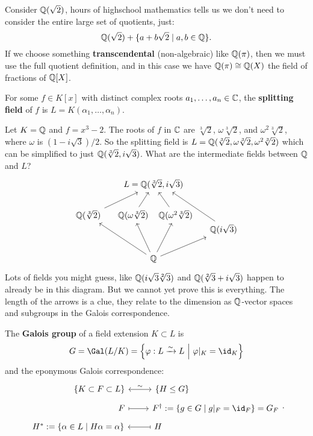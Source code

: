 \documentclass{article}
\begin{document}
Consider $\mathbb{Q}(\sqrt{2})$, hours of highschool mathematics tells us we don't need to consider the entire large set of quotients, just: \[
\mathbb{Q}(\sqrt{2}) + \{a + b\sqrt{2} \mid a,b\in\mathbb{Q}\}.
\]
If we choose something \textbf{transcendental} (non-algebraic) like $\mathbb{Q}(\pi)$, then we must use the full quotient definition, and in this case we have $\mathbb{Q}(\pi)\cong \mathbb{Q}(X)$ the field of fractions of $\mathbb{Q}[X]$.

\begin{definition}
    For some $f\in K[x]$ with distinct complex roots $a_1,\ldots,a_n\in\mathbb{C}$, the \textbf{splitting field} of $f$ is $L=K(\alpha_1,\ldots,\alpha_n)$.
\end{definition}

Let $K=\mathbb{Q}$ and $f=x^3-2$. The roots of $f$ in $\mathbb{C}$ are $\sqrt[3]{2}$, $\omega \sqrt[3]{2}$, and $\omega^2\sqrt[3]{2}$, where $\omega$ is $(1-i\sqrt{3})/2$. So the splitting field is $L=\mathbb{Q}(\sqrt[3]{2},\omega\sqrt[3]{2},\omega^2\sqrt[3]{2})$ which can be simplified to just $\mathbb{Q}(\sqrt[3]{2},i\sqrt{3})$. What are the intermediate fields between $\mathbb{Q}$ and $L$? 
\vspace{-10pt}
\[
\begin{tikzcd}[column sep=small]
& &[-50pt] L = \bQ(\sqrt[3]{2},i\sqrt{3})\\
\bQ(\sqrt[3]{2}) \arrow[urr] 
& \bQ(\omega\sqrt[3]{2}) \arrow[ur] 
& &[-50pt] \bQ(\omega^2\sqrt[3]{2}) \arrow[ul]\\[-20pt]
& & & & \bQ(i\sqrt{3})\arrow[uull, end anchor={[xshift=-4ex]south east}]\\
& & \bQ \arrow[uull] \arrow[uul] \arrow[uur] \arrow[urr]
\end{tikzcd}
\] Lots of fields you might guess, like $\mathbb{Q}(i\sqrt{3}\sqrt[2]{3})$ and $\mathbb{Q}(\sqrt[2]{3} + i\sqrt{3})$ happen to already be in this diagram. But we cannot yet prove this is everything. The length of the arrows is a clue, they relate to the dimension as $\mathbb{Q}$-vector spaces and subgroups in the Galois correspondence.

\begin{theorem}
    The \textbf{Galois group} of a field extension $K\subset L$ is \[
        G = \Gal(L/K) = \left\{\varphi:L \xrightarrow{\sim} L \ \middle| \ \varphi\vert_K = \id_K\right\}
    \] and the eponymous Galois correspondence:\[
    \begin{tikzcd}[row sep = tiny]
        \phantom{..................}\{K\subset F \subset L\} \arrow[r, leftrightarrow, "\sim"] & 
        \{H\leq G\}\phantom{.....................................}\\
        \phantom{.....................................}F \arrow[r, maps to] & 
        F^\dagger := \{g\in G \mid g\vert_F = \id_F\} = G_F\\
        H^* := \{\alpha \in L \mid H\alpha = \alpha\} & 
        H \arrow[l, maps to] \phantom{.................................................}
    \end{tikzcd}.
    \]
\end{theorem}
\end{document}
